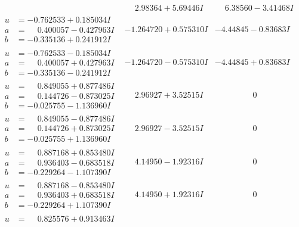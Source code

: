 \documentclass[1p]{elsarticle_modified}
\theoremstyle{definition}
\begin{document}
$$\begin{array}{c|c|c}
 & \phantom{-}2.98364 + 5.69446 I & \phantom{-}6.38560 - 3.41468 I \\ \hline\begin{aligned}
u &= -0.762533 + 0.185034 I \\
a &= \phantom{-}0.400057 - 0.427963 I \\
b &= -0.335136 + 0.241912 I\end{aligned}
 & -1.264720 + 0.575310 I & -4.44845 - 0.83683 I \\ \hline\begin{aligned}
u &= -0.762533 - 0.185034 I \\
a &= \phantom{-}0.400057 + 0.427963 I \\
b &= -0.335136 - 0.241912 I\end{aligned}
 & -1.264720 - 0.575310 I & -4.44845 + 0.83683 I \\ \hline\begin{aligned}
u &= \phantom{-}0.849055 + 0.877486 I \\
a &= \phantom{-}0.144726 - 0.873025 I \\
b &= -0.025755 - 1.136960 I\end{aligned}
 & \phantom{-}2.96927 + 3.52515 I & \phantom{-0.000000 } 0 \\ \hline\begin{aligned}
u &= \phantom{-}0.849055 - 0.877486 I \\
a &= \phantom{-}0.144726 + 0.873025 I \\
b &= -0.025755 + 1.136960 I\end{aligned}
 & \phantom{-}2.96927 - 3.52515 I & \phantom{-0.000000 } 0 \\ \hline\begin{aligned}
u &= \phantom{-}0.887168 + 0.853480 I \\
a &= \phantom{-}0.936403 - 0.683518 I \\
b &= -0.229264 - 1.107390 I\end{aligned}
 & \phantom{-}4.14950 - 1.92316 I & \phantom{-0.000000 } 0 \\ \hline\begin{aligned}
u &= \phantom{-}0.887168 - 0.853480 I \\
a &= \phantom{-}0.936403 + 0.683518 I \\
b &= -0.229264 + 1.107390 I\end{aligned}
 & \phantom{-}4.14950 + 1.92316 I & \phantom{-0.000000 } 0 \\ \hline\begin{aligned}
u &= \phantom{-}0.825576 + 0.913463 I \\

\end{aligned}
\end{array}$$
\end{document}
